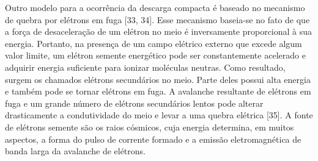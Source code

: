 \documentclass[a4paper, 12pt, onecolumn,singlespacing]{article}
\begin{document}
	Outro modelo para a ocorrência da descarga compacta é baseado no mecanismo de quebra por elétrons em fuga [33, 34]. Esse mecanismo baseia-se no fato de que a força de desaceleração de um elétron no meio é inversamente proporcional à sua energia. Portanto, na presença de um campo elétrico externo que excede algum valor limite, um elétron semente energético pode ser constantemente acelerado e adquirir energia suficiente para ionizar moléculas neutras. Como resultado, surgem os chamados elétrons secundários no meio. Parte deles possui alta energia e também pode se tornar elétrons em fuga. A avalanche resultante de elétrons em fuga e um grande número de elétrons secundários lentos pode alterar drasticamente a condutividade do meio e levar a uma quebra elétrica [35]. A fonte de elétrons semente são os raios cósmicos, cuja energia determina, em muitos aspectos, a forma do pulso de corrente formado e a emissão eletromagnética de banda larga da avalanche de elétrons.
	
\end{document}
